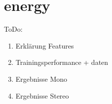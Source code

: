 \chapter{energy}\label{energy}

ToDo:
\begin{enumerate}[nosep]
    \item Erklärung Features
    \item Trainingsperformance + daten
    \item Ergebnisse Mono
    \item Ergebnisse Stereo
\end{enumerate}
